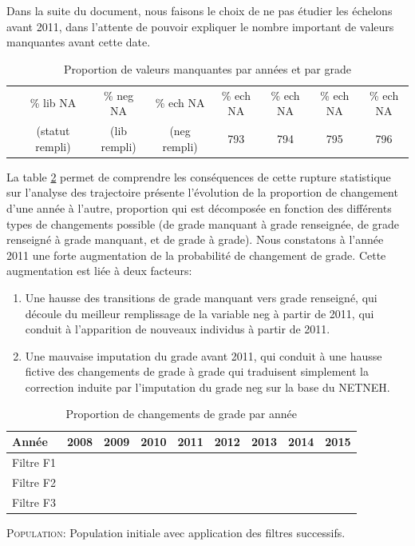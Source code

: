 \documentclass[11pt,a4paper]{article}
\begin{document}
Dans la suite du document, nous faisons le choix de ne pas étudier les échelons avant 2011, dans l'attente de pouvoir expliquer le nombre important de valeurs manquantes avant cette date. 



\begin{table}[h!]
\centering
\caption{Proportion de valeurs manquantes par années et par grade} 
\label{quality1}
\begin{tabular}{lccccccc}
\toprule
 & \%  lib NA & \% neg NA  & \% ech NA & \% ech NA   & \% ech NA   & \% ech NA  & \% ech NA  \\ 
&(statut rempli) & (lib rempli) & (neg rempli) & 793 & 794 & 795 & 796 \\
\midrule 
 
\bottomrule
\end{tabular}
\end{table}




La table \ref{quality2} permet de comprendre les conséquences de cette rupture statistique sur l'analyse des trajectoire présente l'évolution de la proportion de changement d'une année à l'autre, proportion qui est décomposée en fonction des différents types de changements possible (de grade manquant à grade renseignée, de grade renseigné à grade manquant, et de grade à grade). 
Nous constatons à l'année 2011 une forte augmentation de la probabilité de changement de grade. Cette augmentation est liée à deux facteurs: 
\begin{enumerate}[leftmargin=1cm ,parsep=0cm,itemsep=0cm,topsep=0cm]
\item Une hausse des transitions de grade manquant vers grade renseigné, qui découle du meilleur remplissage de la variable neg à partir de 2011, qui conduit à l'apparition de nouveaux individus à partir de 2011.  
\item Une mauvaise imputation du grade avant 2011, qui conduit à une hausse fictive des changements de grade à grade qui traduisent simplement la correction induite par l'imputation du grade neg sur la base du NETNEH. 
\end{enumerate}
 

\begin{table}[H]
\centering
\caption{Proportion de changements de grade par année} 
\label{quality2}
\begin{tabular}{lcccccccc}
\toprule
Année & 2008 & 2009 & 2010 & 2011 & 2012 & 2013 & 2014 & 2015 \\[0.2em]
\midrule
Filtre F1 &&&&&& \\ \midrule
 
\midrule
Filtre F2 &&&&&& \\ \midrule
   
\midrule
Filtre F3 &&&&&& \\ \midrule
   
\bottomrule
\end{tabular}
\begin{minipage}{12cm}
\footnotesize
\textsc{Population:} Population initiale avec application des filtres successifs.
\end{minipage}
\end{table}
\end{document}
